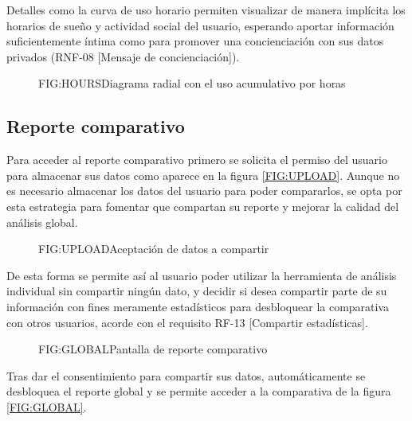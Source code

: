 Detalles como la curva de uso horario permiten visualizar de manera implícita los horarios de sueño y actividad social del usuario, esperando aportar información suficientemente íntima como para promover una concienciación con sus datos privados (RNF-08 [Mensaje de concienciación]).

\begin{figure}[]{FIG:HOURS}{Diagrama radial con el uso acumulativo por horas}
\end{figure}

\subsection{Reporte comparativo}

Para acceder al reporte comparativo primero se solicita el permiso del usuario para almacenar sus datos como aparece en la figura \ref{FIG:UPLOAD}. Aunque no es necesario almacenar los datos del usuario para poder compararlos, se opta por esta estrategia para fomentar que compartan su reporte y mejorar la calidad del análisis global.

\begin{figure}[]{FIG:UPLOAD}{Aceptación de datos a compartir}
\end{figure}

De esta forma se permite así al usuario poder utilizar la herramienta de análisis individual sin compartir ningún dato, y decidir si desea compartir parte de su información con fines meramente estadísticos para desbloquear la comparativa con otros usuarios, acorde con el requisito RF-13 [Compartir estadísticas].

\begin{figure}[]{FIG:GLOBAL}{Pantalla de reporte comparativo}
\end{figure}

Tras dar el consentimiento para compartir sus datos, automáticamente se desbloquea el reporte global y se permite acceder a la comparativa de la figura \ref{FIG:GLOBAL}.

\newpage
